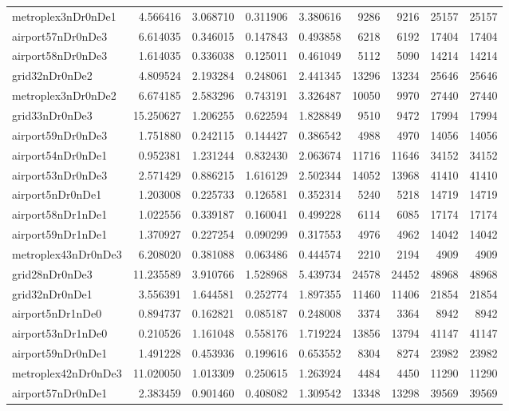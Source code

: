 \begin{longtable}{|l|r|r|r|r|r|r|r|r|}
metroplex3nDr0nDe1 & 4.566416 & 3.068710 & 0.311906 & 3.380616 & 9286 & 9216 & 25157 & 25157 \\
airport57nDr0nDe3 & 6.614035 & 0.346015 & 0.147843 & 0.493858 & 6218 & 6192 & 17404 & 17404 \\
airport58nDr0nDe3 & 1.614035 & 0.336038 & 0.125011 & 0.461049 & 5112 & 5090 & 14214 & 14214 \\
grid32nDr0nDe2 & 4.809524 & 2.193284 & 0.248061 & 2.441345 & 13296 & 13234 & 25646 & 25646 \\
metroplex3nDr0nDe2 & 6.674185 & 2.583296 & 0.743191 & 3.326487 & 10050 & 9970 & 27440 & 27440 \\
grid33nDr0nDe3 & 15.250627 & 1.206255 & 0.622594 & 1.828849 & 9510 & 9472 & 17994 & 17994 \\
airport59nDr0nDe3 & 1.751880 & 0.242115 & 0.144427 & 0.386542 & 4988 & 4970 & 14056 & 14056 \\
airport54nDr0nDe1 & 0.952381 & 1.231244 & 0.832430 & 2.063674 & 11716 & 11646 & 34152 & 34152 \\
airport53nDr0nDe3 & 2.571429 & 0.886215 & 1.616129 & 2.502344 & 14052 & 13968 & 41410 & 41410 \\
airport5nDr0nDe1 & 1.203008 & 0.225733 & 0.126581 & 0.352314 & 5240 & 5218 & 14719 & 14719 \\
airport58nDr1nDe1 & 1.022556 & 0.339187 & 0.160041 & 0.499228 & 6114 & 6085 & 17174 & 17174 \\
airport59nDr1nDe1 & 1.370927 & 0.227254 & 0.090299 & 0.317553 & 4976 & 4962 & 14042 & 14042 \\
metroplex43nDr0nDe3 & 6.208020 & 0.381088 & 0.063486 & 0.444574 & 2210 & 2194 & 4909 & 4909 \\
grid28nDr0nDe3 & 11.235589 & 3.910766 & 1.528968 & 5.439734 & 24578 & 24452 & 48968 & 48968 \\
grid32nDr0nDe1 & 3.556391 & 1.644581 & 0.252774 & 1.897355 & 11460 & 11406 & 21854 & 21854 \\
airport5nDr1nDe0 & 0.894737 & 0.162821 & 0.085187 & 0.248008 & 3374 & 3364 & 8942 & 8942 \\
airport53nDr1nDe0 & 0.210526 & 1.161048 & 0.558176 & 1.719224 & 13856 & 13794 & 41147 & 41147 \\
airport59nDr0nDe1 & 1.491228 & 0.453936 & 0.199616 & 0.653552 & 8304 & 8274 & 23982 & 23982 \\
metroplex42nDr0nDe3 & 11.020050 & 1.013309 & 0.250615 & 1.263924 & 4484 & 4450 & 11290 & 11290 \\
airport57nDr0nDe1 & 2.383459 & 0.901460 & 0.408082 & 1.309542 & 13348 & 13298 & 39569 & 39569 \\

\end{longtable}
